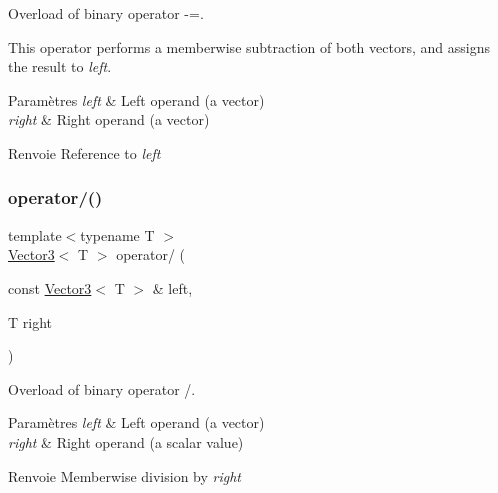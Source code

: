 Overload of binary operator -\/=. 

This operator performs a memberwise subtraction of both vectors, and assigns the result to {\itshape left}.


\begin{DoxyParams}{Paramètres}
{\em left} & Left operand (a vector) \\
\hline
{\em right} & Right operand (a vector)\\
\hline
\end{DoxyParams}
\begin{DoxyReturn}{Renvoie}
Reference to {\itshape left} 
\end{DoxyReturn}
\mbox{\label{classsf_1_1Vector3_ad4ba4a83de236ddeb92a7b759187e90d}} 
\subsubsection{\texorpdfstring{operator/()}{operator/()}}
{\footnotesize\ttfamily template$<$typename T $>$ \\
\hyperlink{classsf_1_1Vector3}{Vector3}$<$ T $>$ operator/ (\begin{DoxyParamCaption}\item[{const \hyperlink{classsf_1_1Vector3}{Vector3}$<$ T $>$ \&}]{left,  }\item[{T}]{right }\end{DoxyParamCaption})\hspace{0.3cm}{\ttfamily [related]}}



Overload of binary operator /. 


\begin{DoxyParams}{Paramètres}
{\em left} & Left operand (a vector) \\
\hline
{\em right} & Right operand (a scalar value)\\
\hline
\end{DoxyParams}
\begin{DoxyReturn}{Renvoie}
Memberwise division by {\itshape right} 
\end{DoxyReturn}
\mbox{\label{classsf_1_1Vector3_a8995a700f9dffccc6dddb3696ae17b64}} 
